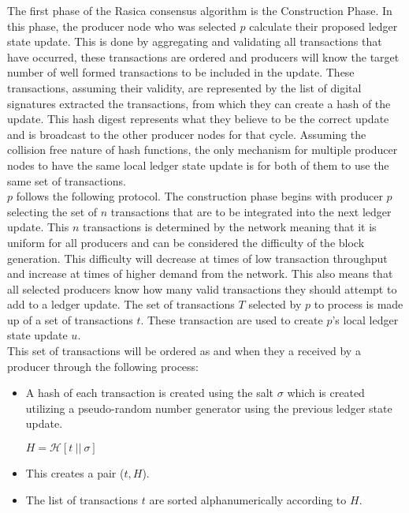 The first phase of the Rasica consensus algorithm is the Construction Phase. In this phase, the producer node who was selected $p$ calculate their proposed ledger state update. This is done by aggregating and validating all transactions that have occurred, these transactions are ordered and producers will know the target number of well formed transactions to be included in the update. These transactions, assuming their validity, are represented by the list of digital signatures extracted the transactions, from which they can create a hash of the update. This hash digest represents what they believe to be the correct update and is broadcast to the other producer nodes for that cycle. Assuming the collision free nature of hash functions, the only mechanism for multiple producer nodes to have the same local ledger state update is for both of them to use the same set of transactions. \\

$p$ follows the following protocol. The construction phase begins with producer $p$ selecting the set of $n$ transactions that are to be integrated into the next ledger update. This $n$ transactions is determined by the network meaning that it is uniform for all producers and can be considered the difficulty of the block generation. This difficulty will decrease at times of low transaction throughput and increase at times of higher demand from the network. This also means that all selected producers know how many valid transactions they should attempt to add to a ledger update. The set of transactions $T$ selected by $p$ to process is made up of a set of transactions $t$. These transaction are used to create $p$'s local ledger state update $u$. \\

This set of transactions will be ordered as and when they a received by a producer through the following process:

\begin{itemize} 
\item A hash of each transaction is created using the salt $\sigma$ which is created utilizing a pseudo-random number generator using the previous ledger state update.
\begin{center}
$H = \mathcal{H}[t~||~\sigma]$
\end{center}
\item This creates a pair ($t,H$).
\item The list of transactions $t$ are sorted alphanumerically according to $H$.
\end{itemize}

